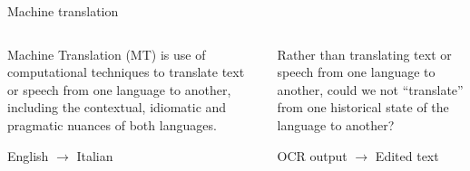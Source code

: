 \documentclass[aspectratio=169]{beamer}
\begin{document}
    \begin{frame}{Machine translation}
        \begin{columns}[t]
            \begin{column}{.48\textwidth}
                \begin{minipage}[t][.42\textheight]{\textwidth}
                    Machine Translation (MT) is use of computational techniques to translate text or speech from one language to another, including the contextual, idiomatic and pragmatic nuances of both languages.
                \end{minipage}
                \begin{minipage}[t][.42\textheight]{\textwidth}
                    \hspace{0pt}
                    \centering
                    \vfill
                    English $\to$ Italian
                    \vfill
                    \hspace{0pt}
                \end{minipage}
            \end{column}
            \begin{column}{.48\textwidth}
                \begin{minipage}[t][.42\textheight]{\textwidth}
                    Rather than translating text or speech from one language to another, could we not ``translate'' from one historical state of the language to another?
                \end{minipage}\par
                \begin{minipage}[t][.42\textheight]{\textwidth}
                    \hspace{0pt}
                    \centering
                    \vfill
                    OCR output $\to$ Edited text
                    \vfill
                    \hspace{0pt}
                \end{minipage}
            \end{column}
        \end{columns}
    \end{frame}

\end{document}
